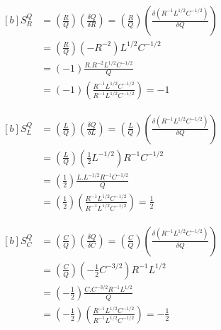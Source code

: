 \begin{equation}
    \begin{aligned}[b]
        S_R^{Q}&=\left(\frac{R}{Q}\right)\left(\frac{\delta Q}{\delta R}\right)=\left(\frac{R}{Q}\right)\left(\frac{\delta (R^{-1}L^{1/2}C^{-1/2})}{\delta Q}\right)\\
        &=\left(\frac{R}{Q}\right)\left(-R^{-2}\right)L^{1/2}C^{-1/2}\\
        &=\left(-1\right)\frac{R.R^{-2}L^{1/2}C^{-1/2}}{Q}\\
        &=\left(-1\right)\left(\frac{R^{-1}L^{1/2}C^{-1/2}}{R^{-1}L^{1/2}C^{-1/2}}\right)=-1
    \end{aligned}
\end{equation}

\begin{equation}
    \begin{aligned}[b]
        S_L^{Q}&=\left(\frac{L}{Q}\right)\left(\frac{\delta Q}{\delta L}\right)=\left(\frac{L}{Q}\right)\left(\frac{\delta (R^{-1}L^{1/2}C^{-1/2})}{\delta Q}\right)\\
        &=\left(\frac{L}{Q}\right)\left(\frac{1}{2}L^{-1/2}\right)R^{-1}C^{-1/2}\\
        &=\left(\frac{1}{2}\right)\frac{L.L^{-1/2}R^{-1}C^{-1/2}}{Q}\\
        &=\left(\frac{1}{2}\right)\left(\frac{R^{-1}L^{1/2}C^{-1/2}}{R^{-1}L^{1/2}C^{-1/2}}\right)=\frac{1}{2}
    \end{aligned}
\end{equation}

\begin{equation}
    \begin{aligned}[b]
        S_C^{Q}&=\left(\frac{C}{Q}\right)\left(\frac{\delta Q}{\delta C}\right)=\left(\frac{C}{Q}\right)\left(\frac{\delta (R^{-1}L^{1/2}C^{-1/2})}{\delta Q}\right)\\
        &=\left(\frac{C}{Q}\right)\left(-\frac{1}{2}C^{-3/2}\right)R^{-1}L^{1/2}\\
        &=\left(-\frac{1}{2}\right)\frac{C.C^{-3/2}R^{-1}L^{1/2}}{Q}\\
        &=\left(-\frac{1}{2}\right)\left(\frac{R^{-1}L^{1/2}C^{-1/2}}{R^{-1}L^{1/2}C^{-1/2}}\right)=-\frac{1}{2}
    \end{aligned}
\end{equation}